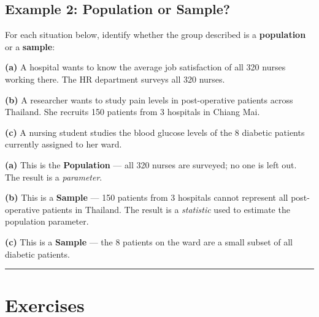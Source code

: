 \documentclass[
  12pt,
  letterpaper,
]{book}
\begin{document}
\section{Example 2: Population or
Sample?}\label{example-2-population-or-sample}

For each situation below, identify whether the group described is a
\textbf{population} or a \textbf{sample}:

\textbf{(a)} A hospital wants to know the average job satisfaction of
all 320 nurses working there. The HR department surveys all 320 nurses.

\textbf{(b)} A researcher wants to study pain levels in post-operative
patients across Thailand. She recruits 150 patients from 3 hospitals in
Chiang Mai.

\textbf{(c)} A nursing student studies the blood glucose levels of the 8
diabetic patients currently assigned to her ward.

\begin{tcolorbox}[enhanced jigsaw, arc=.35mm, bottomrule=.15mm, bottomtitle=1mm, breakable, colback=white, colbacktitle=quarto-callout-tip-color!10!white, colframe=quarto-callout-tip-color-frame, coltitle=black, left=2mm, leftrule=.75mm, opacityback=0, opacitybacktitle=0.6, rightrule=.15mm, title={✅ Solution}, titlerule=0mm, toprule=.15mm, toptitle=1mm]

\textbf{(a)} This is the \textbf{Population} --- all 320 nurses are
surveyed; no one is left out. The result is a \emph{parameter}.

\textbf{(b)} This is a \textbf{Sample} --- 150 patients from 3 hospitals
cannot represent all post-operative patients in Thailand. The result is
a \emph{statistic} used to estimate the population parameter.

\textbf{(c)} This is a \textbf{Sample} --- the 8 patients on the ward
are a small subset of all diabetic patients.

\end{tcolorbox}

\begin{center}\rule{0.5\linewidth}{0.5pt}\end{center}


\chapter{Exercises}\label{exercises}
\end{document}

